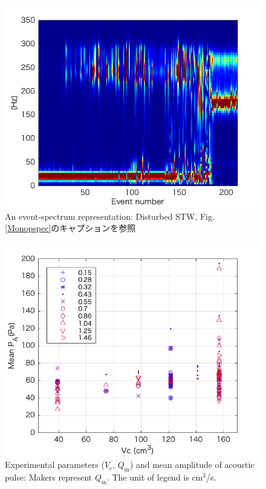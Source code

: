 \documentclass[12pt]{article}
\begin{document}
\begin{figure}[H]
\begin{center}
\includegraphics[scale=1] {Distpspec.png} 
\caption{An event-spectrum representation: Disturbed STW, Fig. \ref{Monopspec}のキャプションを参照}
\label{Distpspec}
\end{center}
\end{figure} 


\begin{figure}[H]
\begin{center}
\includegraphics[scale=1] {QVA.png} 
\caption{Experimental parameters ($V_\mathrm{c}$, $Q_\mathrm{in}$) and mean amplitude of acoustic pulse: Makers represent $Q_\mathrm{in}$. The unit of legend is cm$^3$/s.}
\label{QVA}
\end{center}
\end{figure} 
\end{document}
